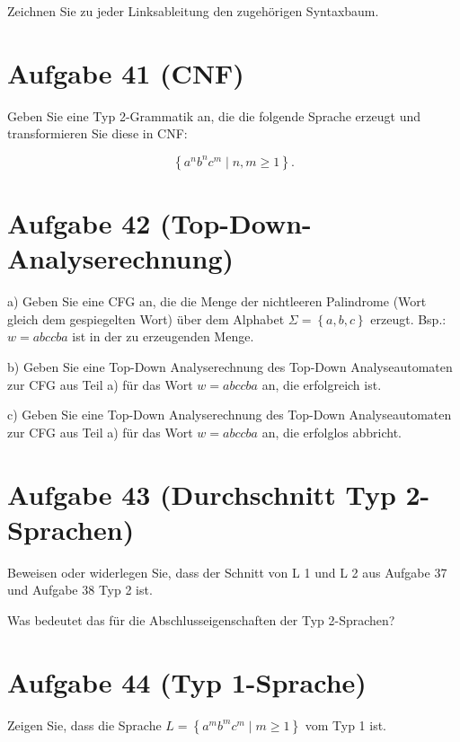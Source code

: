 \documentclass{article}
\begin{document}
Zeichnen Sie zu jeder Linksableitung den zugehörigen Syntaxbaum.


\section*{Aufgabe 41 (CNF)}

Geben Sie eine Typ 2-Grammatik an, die die folgende Sprache erzeugt und transformieren Sie
diese in CNF:

\begin{equation*}
	\left\{a^n b^n c^m \mid n, m \geq 1\right\}.
\end{equation*}


\section*{Aufgabe 42 (Top-Down-Analyserechnung)}

a) Geben Sie eine CFG an, die die Menge der nichtleeren Palindrome (Wort gleich dem gespiegelten Wort) über dem Alphabet $\Sigma = \left\{a, b, c\right\}$ erzeugt. Bsp.: $w=abccba$ ist in der zu erzeugenden Menge.

b) Geben Sie eine Top-Down Analyserechnung des Top-Down Analyseautomaten zur CFG aus Teil a) für das Wort $w=abccba$ an, die erfolgreich ist.

c) Geben Sie eine Top-Down Analyserechnung des Top-Down Analyseautomaten zur CFG aus Teil a) für das Wort $w=abccba$ an, die erfolglos abbricht.


\section*{Aufgabe 43 (Durchschnitt Typ 2-Sprachen)}

Beweisen oder widerlegen Sie, dass der Schnitt von L 1 und L 2 aus Aufgabe 37 und Aufgabe 38 Typ 2 ist.


Was bedeutet das für die Abschlusseigenschaften der Typ 2-Sprachen?


\section*{Aufgabe 44 (Typ 1-Sprache)}

Zeigen Sie, dass die Sprache $L = \left\{a^m b^m c^m \mid m \geq 1\right\}$ vom Typ 1 ist.
\end{document}
